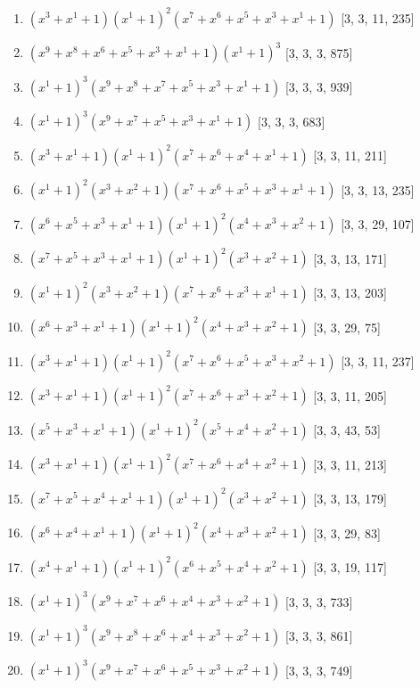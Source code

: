 \documentclass[10pt,twocolumn]{article}
\begin{document}
\begin{enumerate}
\item $(x^{3} + x^{1} + 1)(x^{1} + 1)^{2}(x^{7} + x^{6} + x^{5} + x^{3} + x^{1} + 1)$  [3, 3, 11, 235]
\item $(x^{9} + x^{8} + x^{6} + x^{5} + x^{3} + x^{1} + 1)(x^{1} + 1)^{3}$  [3, 3, 3, 875]
\item $(x^{1} + 1)^{3}(x^{9} + x^{8} + x^{7} + x^{5} + x^{3} + x^{1} + 1)$  [3, 3, 3, 939]
\item $(x^{1} + 1)^{3}(x^{9} + x^{7} + x^{5} + x^{3} + x^{1} + 1)$  [3, 3, 3, 683]
\item $(x^{3} + x^{1} + 1)(x^{1} + 1)^{2}(x^{7} + x^{6} + x^{4} + x^{1} + 1)$  [3, 3, 11, 211]
\item $(x^{1} + 1)^{2}(x^{3} + x^{2} + 1)(x^{7} + x^{6} + x^{5} + x^{3} + x^{1} + 1)$  [3, 3, 13, 235]
\item $(x^{6} + x^{5} + x^{3} + x^{1} + 1)(x^{1} + 1)^{2}(x^{4} + x^{3} + x^{2} + 1)$  [3, 3, 29, 107]
\item $(x^{7} + x^{5} + x^{3} + x^{1} + 1)(x^{1} + 1)^{2}(x^{3} + x^{2} + 1)$  [3, 3, 13, 171]
\item $(x^{1} + 1)^{2}(x^{3} + x^{2} + 1)(x^{7} + x^{6} + x^{3} + x^{1} + 1)$  [3, 3, 13, 203]
\item $(x^{6} + x^{3} + x^{1} + 1)(x^{1} + 1)^{2}(x^{4} + x^{3} + x^{2} + 1)$  [3, 3, 29, 75]
\item $(x^{3} + x^{1} + 1)(x^{1} + 1)^{2}(x^{7} + x^{6} + x^{5} + x^{3} + x^{2} + 1)$  [3, 3, 11, 237]
\item $(x^{3} + x^{1} + 1)(x^{1} + 1)^{2}(x^{7} + x^{6} + x^{3} + x^{2} + 1)$  [3, 3, 11, 205]
\item $(x^{5} + x^{3} + x^{1} + 1)(x^{1} + 1)^{2}(x^{5} + x^{4} + x^{2} + 1)$  [3, 3, 43, 53]
\item $(x^{3} + x^{1} + 1)(x^{1} + 1)^{2}(x^{7} + x^{6} + x^{4} + x^{2} + 1)$  [3, 3, 11, 213]
\item $(x^{7} + x^{5} + x^{4} + x^{1} + 1)(x^{1} + 1)^{2}(x^{3} + x^{2} + 1)$  [3, 3, 13, 179]
\item $(x^{6} + x^{4} + x^{1} + 1)(x^{1} + 1)^{2}(x^{4} + x^{3} + x^{2} + 1)$  [3, 3, 29, 83]
\item $(x^{4} + x^{1} + 1)(x^{1} + 1)^{2}(x^{6} + x^{5} + x^{4} + x^{2} + 1)$  [3, 3, 19, 117]
\item $(x^{1} + 1)^{3}(x^{9} + x^{7} + x^{6} + x^{4} + x^{3} + x^{2} + 1)$  [3, 3, 3, 733]
\item $(x^{1} + 1)^{3}(x^{9} + x^{8} + x^{6} + x^{4} + x^{3} + x^{2} + 1)$  [3, 3, 3, 861]
\item $(x^{1} + 1)^{3}(x^{9} + x^{7} + x^{6} + x^{5} + x^{3} + x^{2} + 1)$  [3, 3, 3, 749]

\end{enumerate}
\end{document}
